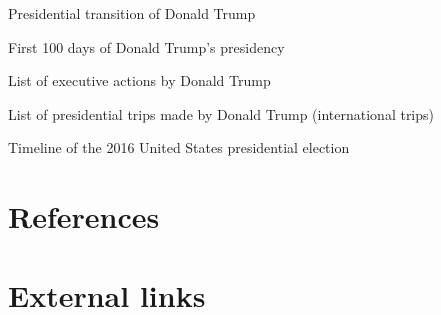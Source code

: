 Presidential transition of Donald Trump

First 100 days of Donald Trump's presidency

List of executive actions by Donald Trump

List of presidential trips made by Donald Trump (international trips)

Timeline of the 2016 United States presidential election

\section{References}\label{references}

\section{External links}\label{external-links}
